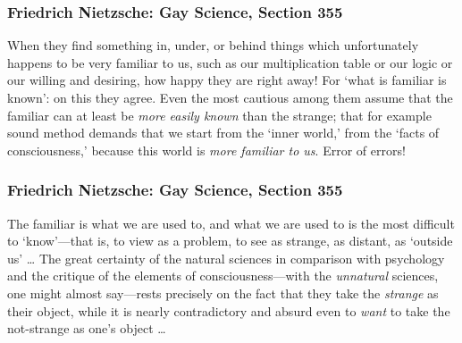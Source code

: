 \documentclass[xcolor=dvipsnames]{beamer}
\begin{document}
\begin{frame}
  \frametitle{Friedrich Nietzsche: Gay Science, Section 355}
  When they find something in, under, or behind things which
  unfortunately happens to be very familiar to us, such as our
  multiplication table or our logic or our willing and desiring, how
  happy they are right away! For `what is familiar is known': on this
  they agree. Even the most cautious among them assume that the
  familiar can at least be \emph{more easily known} than the strange;
  that for example sound method demands that we start from the `inner
  world,' from the `facts of consciousness,' because this world is
  \emph{more familiar to us}. Error of errors!
\end{frame}

\begin{frame}
  \frametitle{Friedrich Nietzsche: Gay Science, Section 355}
  The familiar is what we are used to, and what we are used to is the
  most difficult to `know'---that is, to view as a problem, to see as
  strange, as distant, as `outside us' {\ldots} The great certainty of
  the natural sciences in comparison with psychology and the critique
  of the elements of consciousness---with the \emph{unnatural}
  sciences, one might almost say---rests precisely on the fact that
  they take the \emph{strange} as their object, while it is nearly
  contradictory and absurd even to \emph{want} to take the not-strange
  as one's object {\ldots}
\end{frame}
\end{document}
